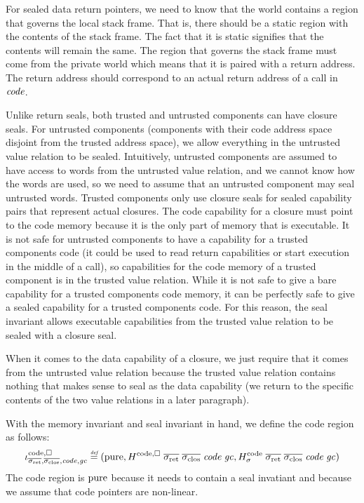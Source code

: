 \begin{jversion}
For sealed data return pointers, we need to know that the world contains a region that governs the local stack frame.
That is, there should be a static region with the contents of the stack frame.
The fact that it is static signifies that the contents will remain the same.
The region that governs the stack frame must come from the private world which means that it is paired with a return address.
The return address should correspond to an actual return address of a call in $\mathit{code}$.

Unlike return seals, both trusted and untrusted components can have closure seals.
For untrusted components (components with their code address space disjoint from the trusted address space), we allow everything in the untrusted value relation to be sealed.
Intuitively, untrusted components are assumed to have access to words from the untrusted value relation, and we cannot know how the words are used, so we need to assume that an untrusted component may seal untrusted words.
Trusted components only use closure seals for sealed capability pairs that represent actual closures.
The code capability for a closure must point to the code memory because it is the only part of memory that is executable.
It is not safe for untrusted components to have a capability for a trusted components code (it could be used to read return capabilities or start execution in the middle of a call), so capabilities for the code memory of a trusted component is in the trusted value relation.
While it is not safe to give a bare capability for a trusted components code memory, it can be perfectly safe to give a sealed capability for a trusted components code.
For this reason, the seal invariant allows executable capabilities from the trusted value relation to be sealed with a closure seal.

When it comes to the data capability of a closure, we just require that it comes from the untrusted value relation because the trusted value relation contains nothing that makes sense to seal as the data capability
(we return to the specific contents of the two value relations in a later paragraph).

With the memory invariant and seal invariant in hand, we define the code region as follows:
\[
  \codereg{\sigrets,\sigcloss,\code,\gc} \defeq (\pure, H^\mathrm{code,\square} \; \sigrets \; \sigcloss \; \code \; \gc, H^\mathrm{code}_\sigma \; \sigrets \; \sigcloss \; \code \; \gc)
\]
The code region is $\mathrm{pure}$ because it needs to contain a seal invatiant and because we assume that code pointers are non-linear.


\end{jversion}
